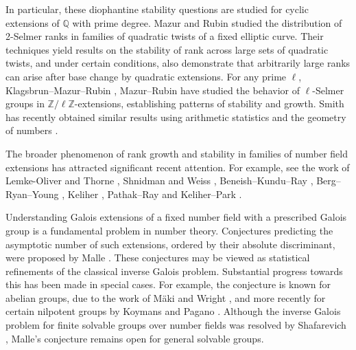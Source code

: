 \documentclass[11pt,reqno]{amsart}
\newcommand{\Q}{\mathbb{Q}}
\numberwithin{equation}{section}
\begin{document}
\par In particular, these diophantine stability questions are studied for cyclic extensions of $\Q$ with prime degree. Mazur and Rubin \cite{MazurRubinQtwists} studied the distribution of 2-Selmer ranks in families of quadratic twists of a fixed elliptic curve. Their techniques yield results on the stability of rank across large sets of quadratic twists, and under certain conditions, also demonstrate that arbitrarily large ranks can arise after base change by quadratic extensions. For any prime \( \ell \), Klagsbrun--Mazur--Rubin \cite{KMR}, Mazur--Rubin \cite{mazur2018diophantine} have studied the behavior of \( \ell \)-Selmer groups in \( \mathbb{Z}/\ell\mathbb{Z} \)-extensions, establishing patterns of stability and growth. Smith has recently obtained similar results using arithmetic statistics and the geometry of numbers \cite{smith2022distribution1, smith2022distribution2}. 

The broader phenomenon of rank growth and stability in families of number field extensions has attracted significant recent attention. For example, see the work of Lemke-Oliver and Thorne \cite{Oliverthorne}, Shnidman and Weiss \cite{ShnidmanWeiss}, Beneish--Kundu--Ray \cite{BKR}, Berg--Ryan--Young \cite{Berg}, Keliher \cite{keliher}, Pathak--Ray \cite{pathakray} and Keliher--Park \cite{keliherpark}. %

Understanding Galois extensions of a fixed number field with a prescribed Galois group is a fundamental problem in number theory. Conjectures predicting the asymptotic number of such extensions, ordered by their absolute discriminant, were proposed by Malle \cite{Malle1, Malle2}. These conjectures may be viewed as statistical refinements of the classical inverse Galois problem. Substantial progress towards this has been made in special cases. For example, the conjecture is known for abelian groups, due to the work of Mäki \cite{maki1985density} and Wright \cite{wright1989distribution}, and more recently for certain nilpotent groups by Koymans and Pagano \cite{koymans2023malle}. Although the inverse Galois problem for finite solvable groups over number fields was resolved by Shafarevich \cite{Shaferevich}, Malle's conjecture remains open for general solvable groups.
\end{document}
